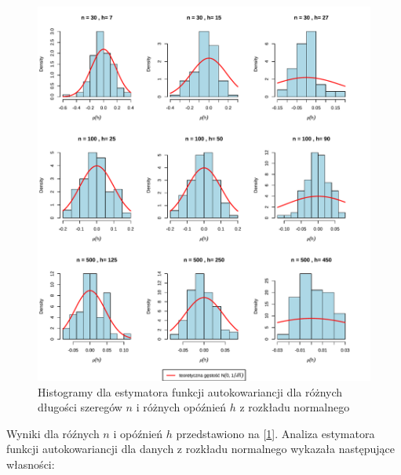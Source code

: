 \documentclass[10pt, a4paper]{article}\usepackage[]{graphicx}\usepackage[]{xcolor}
\makeatletter
\def\maxwidth{ %
  \ifdim\Gin@nat@width>\linewidth
    \linewidth
  \else
    \Gin@nat@width
  \fi
}
\newenvironment{knitrout}{}{} %
\makeatother
\begin{document}
\begin{knitrout}
\color{fgcolor}\begin{figure}[H]

{\centering \includegraphics[width=\maxwidth]{figure/wykresy-gamma-norm-1} 

}

\caption[Histogramy dla estymatora funkcji autokowariancji dla różnych długości szeregów $n$ i różnych opóźnień $h$ z rozkładu normalnego]{Histogramy dla estymatora funkcji autokowariancji dla różnych długości szeregów $n$ i różnych opóźnień $h$ z rozkładu normalnego}\label{fig:wykresy-gamma-norm}
\end{figure}

\end{knitrout}


\newpage
Wyniki dla róźnych $n$ i opóźnień $h$ przedstawiono na [\ref{fig:wykresy-gamma-norm}].
Analiza estymatora funkcji autokowariancji dla danych z rozkładu normalnego wykazała następujące własności:
\end{document}
